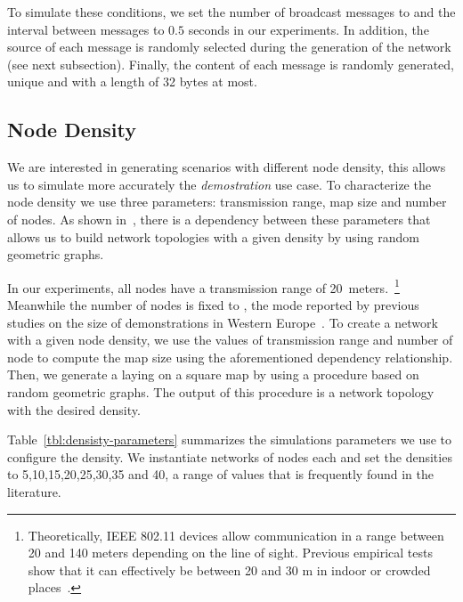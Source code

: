 To simulate these conditions,  we set the number of broadcast messages to \nrMessages{} and the interval between messages to $0.5$ seconds in our experiments.
%
In addition, the source of each message is randomly selected during the generation of the network (see next subsection).
%
Finally, the content of each message is randomly generated, unique and with a length of 32 bytes at most. 
%
%

\subsection*{Node Density}

We are interested in generating scenarios with different node density, this allows us to simulate more accurately the \textit{demostration} use case.
%
%
To characterize the node density we use three parameters: transmission range, map size and number of nodes.
%
As shown in~\cite{Penrose2003}, there is a dependency between these parameters that  allows us to build network topologies with a given density by using random geometric graphs.
%

In our experiments, all nodes have a transmission range of 20~meters.~\footnote{Theoretically, IEEE 802.11 devices allow communication in a range between 20 and 140 meters depending on the line of sight.
Previous empirical tests show that it can effectively be between 20 and 30 m in indoor or crowded places~\cite{Garbinato2010}.}
Meanwhile the number of nodes is fixed to \nodesNumber{}, the mode reported by previous studies on the size of demonstrations in Western Europe~\cite{kriesi1995new}.
%
To create a network with a given node density, we use the values of transmission range and number of node to compute the map size using the aforementioned dependency relationship.
%
Then, we generate a laying on a square map by using a procedure based on random geometric graphs.
%
The output of this procedure is a network topology with the desired density.
%

Table~\ref{tbl:densisty-parameters} summarizes the simulations parameters we use to configure the density.
%
We instantiate \densitiesNumber{} networks of \nodesNumber{} nodes each and set the densities to  5,10,15,20,25,30,35 and 40, a range of values that is frequently found in the literature.

